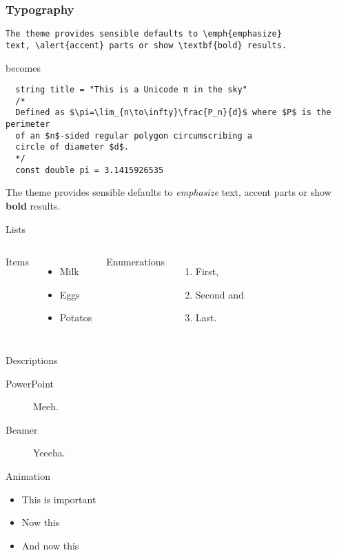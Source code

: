 \documentclass[10pt, compress]{beamer}
\begin{document}
\begin{frame}[fragile]
  \frametitle{Typography}
      \begin{verbatim}
The theme provides sensible defaults to \emph{emphasize}
text, \alert{accent} parts or show \textbf{bold} results.
      \end{verbatim}

  \begin{center}becomes\end{center}
  
\begin{verbatim}
  string title = "This is a Unicode π in the sky"
  /*
  Defined as $\pi=\lim_{n\to\infty}\frac{P_n}{d}$ where $P$ is the perimeter
  of an $n$-sided regular polygon circumscribing a
  circle of diameter $d$.
  */
  const double pi = 3.1415926535
\end{verbatim}

  The theme provides sensible defaults to \emph{emphasize} text,
  \alert{accent} parts or show \textbf{bold} results.
\end{frame}
\begin{frame}{Lists}
  \begin{columns}[onlytextwidth]
      Items
      \begin{itemize}
        \item Milk \item Eggs \item Potatos
      \end{itemize}

      Enumerations
      \begin{enumerate}
        \item First, \item Second and \item Last.
      \end{enumerate}
  \end{columns}
\end{frame}
\begin{frame}{Descriptions}
  \begin{description}
    \item[PowerPoint] Meeh.
    \item[Beamer] Yeeeha.
  \end{description}
\end{frame}
\begin{frame}{Animation}
  \begin{itemize}[<+- | alert@+>]
    \item \alert<4>{This is important}
    \item Now this
    \item And now this
  \end{itemize}
\end{frame}
\end{document}
